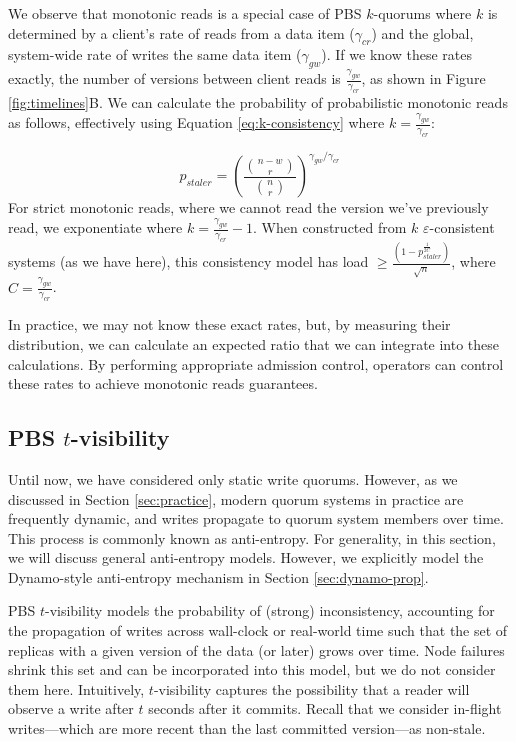 \documentclass{vldb}
\begin{document}
We observe that monotonic reads is a special case of PBS
$k$-quorums where $k$ is determined by a client's rate of reads from a
data item ($\gamma_{cr}$) and the global, system-wide rate of writes
the same data item ($\gamma_{gw}$).  If we know these rates
exactly, the number of versions between client reads is
$\frac{\gamma_{gw}}{\gamma_{cr}}$, as shown in Figure
\ref{fig:timelines}B.  We can calculate the probability of
probabilistic monotonic reads as follows, effectively using Equation
\ref{eq:k-consistency} where $k=\frac{\gamma_{gw}}{\gamma_{cr}}$:

\begin{equation}
\label{eq:prob-mr}
p_{staler} = \left(\frac{{n-w \choose r}}{{n \choose r}}\right)^{\gamma_{gw}/\gamma_{cr}}
\end{equation}
For strict monotonic reads, where we cannot read the version we've
previously read, we exponentiate where
$k=\frac{\gamma_{gw}}{\gamma_{cr}}-1$.  When constructed from $k$
$\varepsilon$-consistent systems (as we have here), this consistency
model has load $\geq \frac{(1-p_{staler}^{\frac{1}{2C}})}{\sqrt{n}}$,
where $C=\frac{\gamma_{gw}}{\gamma_{cr}}$.

In practice, we may not know these exact rates, but, by measuring
their distribution, we can calculate an expected ratio that we can
integrate into these calculations.  By performing appropriate
admission control, operators can control these rates to achieve
monotonic reads guarantees.

\subsection{PBS $t$-visibility}

Until now, we have considered only static write quorums.  However, as
we discussed in Section \ref{sec:practice}, modern quorum systems in
practice are frequently dynamic, and writes propagate to quorum system
members over time.  This process is commonly known as anti-entropy.
For generality, in this section, we will discuss general anti-entropy
models. However, we explicitly model the Dynamo-style anti-entropy
mechanism in Section \ref{sec:dynamo-prop}.

PBS $t$-visibility models the probability of (strong) inconsistency,
accounting for the propagation of writes across wall-clock or
real-world time such that the set of replicas with a given version of
the data (or later) grows over time.  Node failures shrink this set
and can be incorporated into this model, but we do not consider them
here.  Intuitively, $t$-visibility captures the possibility that a
reader will observe a write after $t$ seconds after it commits.
Recall that we consider in-flight writes---which are more recent than
the last committed version---as non-stale.
\end{document}
